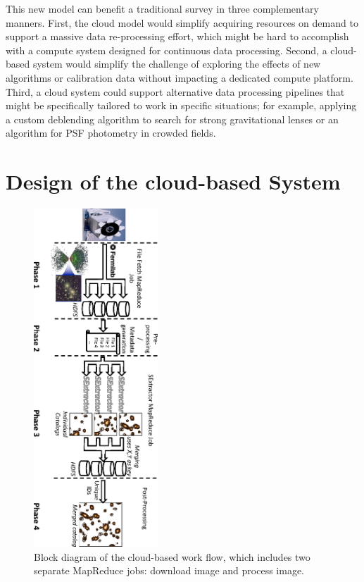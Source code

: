 This new model can benefit a traditional survey in three complementary manners. 
First, the cloud model would simplify acquiring resources on demand to support a massive data re-processing effort, which might be hard to accomplish with a compute system designed for continuous data processing. 
Second, a cloud-based system would simplify the challenge of exploring the effects of new algorithms or calibration data without impacting a dedicated compute platform. 
Third, a cloud system could support alternative data processing pipelines that might be specifically tailored to work in specific situations; for example, applying a custom deblending algorithm to search for strong gravitational lenses or an algorithm for PSF photometry in crowded fields. 

\section{Design of the cloud-based System}

\begin{figure}[t!]
	\vspace{0.1in}
	\centering
	\includegraphics[height=5.0in, angle=90]{part4/Farivar_O12/Diagram.eps}
	\caption{Block diagram of the cloud-based work flow, which includes two separate MapReduce jobs: download image  and  process image.}
	\label{bdiagram}
\end{figure}


